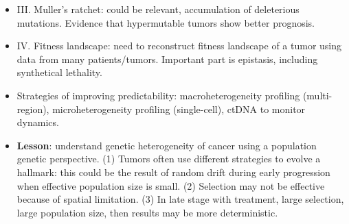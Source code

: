 \documentclass{report}
\begin{document}
\begin{itemize}
	\item III. Muller’s ratchet: could be relevant, accumulation of deleterious mutations. Evidence that hypermutable tumors show better prognosis. 
	
	\item IV. Fitness landscape: need to reconstruct fitness landscape of a tumor using data from many patients/tumors. Important part is epistasis, including synthetical lethality. 
	
	\item Strategies of improving predictability: macroheterogeneity profiling (multi-region), microheterogeneity profiling (single-cell), ctDNA to monitor dynamics. 
	
	\item \textbf{Lesson}: understand genetic heterogeneity of cancer using a population genetic perspective. (1) Tumors often use different strategies to evolve a hallmark: this could be the result of random drift during early progression when effective population size is small. (2) Selection may not be effective because of spatial limitation. (3) In late stage with treatment, large selection, large population size, then results may be more deterministic. 
\end{itemize}
\end{document}
